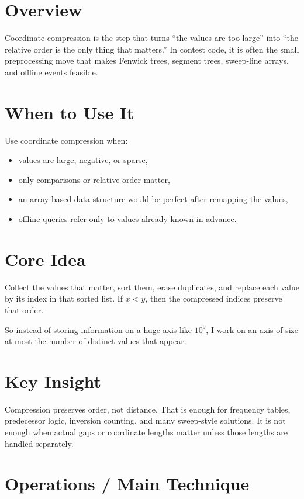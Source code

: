\section*{Overview}

Coordinate compression is the step that turns ``the values are too large'' into ``the relative order is the only thing
that matters.'' In contest code, it is often the small preprocessing move that makes Fenwick trees, segment trees,
sweep-line arrays, and offline events feasible.

\section*{When to Use It}

Use coordinate compression when:

\begin{itemize}
  \item values are large, negative, or sparse,
  \item only comparisons or relative order matter,
  \item an array-based data structure would be perfect after remapping the values,
  \item offline queries refer only to values already known in advance.
\end{itemize}

\section*{Core Idea}

Collect the values that matter, sort them, erase duplicates, and replace each value by its index in that sorted list.
If \(x < y\), then the compressed indices preserve that order.

So instead of storing information on a huge axis like \(10^9\), I work on an axis of size at most the number of
distinct values that appear.

\section*{Key Insight}

Compression preserves order, not distance. That is enough for frequency tables, predecessor logic, inversion counting,
and many sweep-style solutions. It is not enough when actual gaps or coordinate lengths matter unless those lengths are
handled separately.

\section*{Operations / Main Technique}

